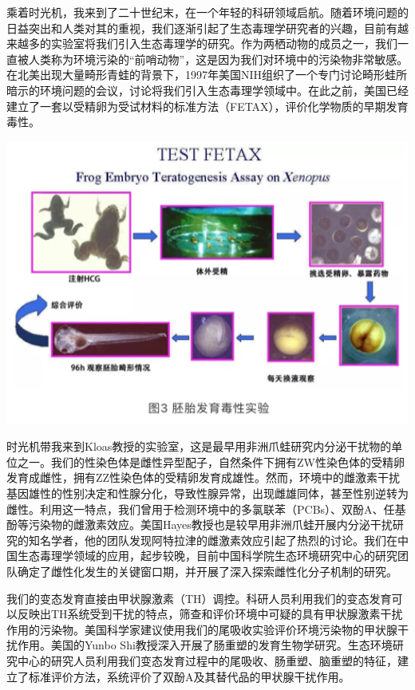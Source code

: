 \documentclass[
]{book}
\begin{document}
乘着时光机，我来到了二十世纪末，在一个年轻的科研领域启航。随着环境问题的日益突出和人类对其的重视，我们逐渐引起了生态毒理学研究者的兴趣，目前有越来越多的实验室将我们引入生态毒理学的研究。作为两栖动物的成员之一，我们一直被人类称为环境污染的``前哨动物''，这是因为我们对环境中的污染物非常敏感。在北美出现大量畸形青蛙的背景下，1997年美国NIH组织了一个专门讨论畸形蛙所暗示的环境问题的会议，讨论将我们引入生态毒理学领域中。在此之前，美国已经建立了一套以受精卵为受试材料的标准方法（FETAX），评价化学物质的早期发育毒性。

\includegraphics[width=6.67in]{images/qingwa3}

时光机带我来到Kloas教授的实验室，这是最早用非洲爪蛙研究内分泌干扰物的单位之一。我们的性染色体是雌性异型配子，自然条件下拥有ZW性染色体的受精卵发育成雌性，拥有ZZ性染色体的受精卵发育成雄性。然而，环境中的雌激素干扰基因雄性的性别决定和性腺分化，导致性腺异常，出现雌雄同体，甚至性别逆转为雌性。利用这一特点，我们曾用于检测环境中的多氯联苯（PCBs）、双酚A、任基酚等污染物的雌激素效应。美国Hayes教授也是较早用非洲爪蛙开展内分泌干扰研究的知名学者，他的团队发现阿特拉津的雌激素效应引起了热烈的讨论。我们在中国生态毒理学领域的应用，起步较晚，目前中国科学院生态环境研究中心的研究团队确定了雌性化发生的关键窗口期，并开展了深入探索雌性化分子机制的研究。

我们的变态发育直接由甲状腺激素（TH）调控。科研人员利用我们的变态发育可以反映出TH系统受到干扰的特点，筛查和评价环境中可疑的具有甲状腺激素干扰作用的污染物。美国科学家建议使用我们的尾吸收实验评价环境污染物的甲状腺干扰作用。美国的Yunbo Shi教授深入开展了肠重塑的发育生物学研究。生态环境研究中心的研究人员利用我们变态发育过程中的尾吸收、肠重塑、脑重塑的特征，建立了标准评价方法，系统评价了双酚A及其替代品的甲状腺干扰作用。
\end{document}
